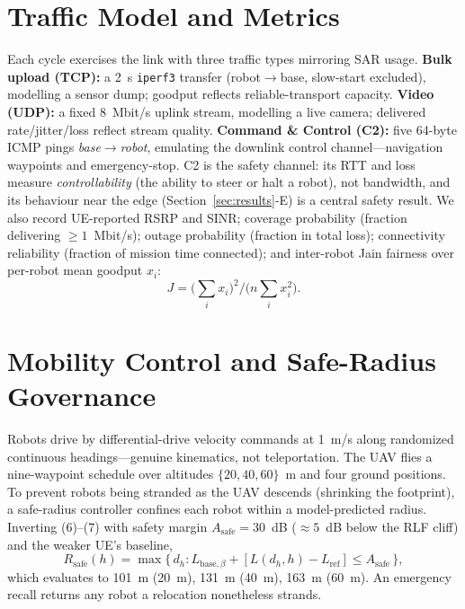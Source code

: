 \documentclass[10pt, conference]{IEEEtran}
\begin{document}
\section{Traffic Model and Metrics}
\label{sec:metrics}
Each cycle exercises the link with three traffic types mirroring SAR usage. \textbf{Bulk upload (TCP):} a 2~s \texttt{iperf3} transfer (robot$\rightarrow$base, slow-start excluded), modelling a sensor dump; goodput reflects reliable-transport capacity. \textbf{Video (UDP):} a fixed 8~Mbit/s uplink stream, modelling a live camera; delivered rate/jitter/loss reflect stream quality. \textbf{Command \& Control (C2):} five 64-byte ICMP pings \emph{base$\rightarrow$robot}, emulating the downlink control channel---navigation waypoints and emergency-stop. C2 is the safety channel: its RTT and loss measure \emph{controllability} (the ability to steer or halt a robot), not bandwidth, and its behaviour near the edge (Section~\ref{sec:results}-E) is a central safety result. We also record UE-reported RSRP and SINR; coverage probability (fraction delivering ${\ge}1$~Mbit/s); outage probability (fraction in total loss); connectivity reliability (fraction of mission time connected); and inter-robot Jain fairness over per-robot mean goodput $x_i$:
\begin{equation}
J = \Big(\textstyle\sum_i x_i\Big)^{2} \Big/ \Big(n \textstyle\sum_i x_i^{2}\Big).
\end{equation}

\section{Mobility Control and Safe-Radius Governance}
Robots drive by differential-drive velocity commands at 1~m/s along randomized continuous headings---genuine kinematics, not teleportation. The UAV flies a nine-waypoint schedule over altitudes $\{20,40,60\}$~m and four ground positions. To prevent robots being stranded as the UAV descends (shrinking the footprint), a safe-radius controller confines each robot within a model-predicted radius. Inverting (6)--(7) with safety margin $A_{\mathrm{safe}}=30$~dB (${\approx}5$~dB below the RLF cliff) and the weaker UE's baseline,
\begin{equation}
\label{eq:rsafe}
R_{\mathrm{safe}}(h) = \max\{\, d_h : L_{\mathrm{base},\beta} + [L(d_h,h)-L_{\mathrm{ref}}] \le A_{\mathrm{safe}} \,\},
\end{equation}
which evaluates to 101~m (20~m), 131~m (40~m), 163~m (60~m). An emergency recall returns any robot a relocation nonetheless strands.
\end{document}
